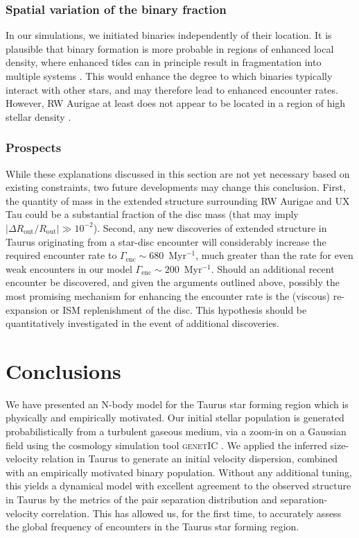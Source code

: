 \documentclass{aa}
\begin{document}
 \subsubsection{Spatial variation of the binary fraction}
   In our simulations, we initiated binaries independently of their location. It is plausible that binary formation is more probable in regions of enhanced local density, where enhanced tides can in principle result in fragmentation into multiple systems \citep{Horton01}. This would enhance the degree to which binaries typically interact with other stars, and may therefore lead to enhanced encounter rates. However, RW Aurigae at least does not appear to be located in a region of high stellar density \citep[e.g.][]{Pfalzner21}. 

\subsubsection{Prospects}
While these explanations discussed in this section are not yet necessary based on existing constraints, two future developments may change this conclusion. First, the quantity of mass in the extended structure surrounding RW Aurigae and UX Tau could be a substantial fraction of the disc mass (that may imply $|\Delta R_\mathrm{out}/R_\mathrm{out}|\gg 10^{-2}$). Second, any new discoveries of extended structure in Taurus originating from a star-disc encounter will considerably increase the required encounter rate to $\Gamma_\mathrm{enc} \sim 680$~Myr$^{-1}$, much greater than the rate for even weak encounters in our model $\Gamma_\mathrm{enc} \sim 200$~Myr$^{-1}$. Should an additional recent encounter be discovered, and given the arguments outlined above, possibly the most promising mechanism for enhancing the encounter rate is the (viscous) re-expansion or ISM replenishment of the disc. This hypothesis should be quantitatively investigated in the event of additional discoveries. 

\section{Conclusions}
\label{sec:conclusions}
We have presented an N-body model for the Taurus star forming region which is physically and empirically motivated.  Our initial stellar population is generated probabilistically from a turbulent gaseous medium, via a zoom-in on a Gaussian field using the cosmology simulation tool \textsc{genetIC} \citep{Stopyra20}. We applied the inferred size-velocity relation in Taurus to generate an initial velocity dispersion, combined with an empirically motivated binary population. Without any additional tuning, this yields a dynamical model with excellent agreement to the observed structure in Taurus by the metrics of the pair separation distribution and separation-velocity correlation. This has allowed us, for the first time, to accurately assess the global frequency of encounters in the Taurus star forming region.
\end{document}
